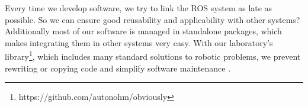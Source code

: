 Every time we develop software, we try to link the ROS system as late as possible. So we can ensure good reusability and applicability with  other systems? Additionally most of our software is managed in standalone packages, which makes integrating them in other systems very easy. With our laboratory's library\footnote{https://github.com/autonohm/obviously}, which includes many standard solutions to robotic problems, we prevent rewriting or copying code and simplify software maintenance .
